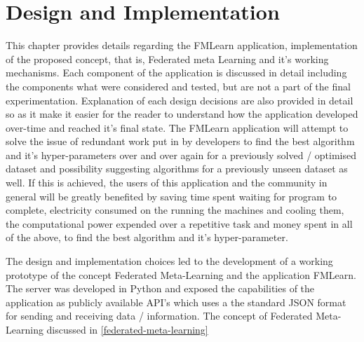 \chapter{Design and Implementation}

This chapter provides details regarding the FMLearn application, implementation of the proposed concept, that is, Federated meta Learning and it's working mechanisms. Each component of the application is discussed in detail including the components what were considered and tested, but are not a part of the final experimentation. Explanation of each design decisions are also provided in detail so as it make it easier for the reader to understand how the application developed over-time and reached it's final state. The FMLearn application will attempt to solve the issue of redundant work put in by developers to find the best algorithm and it's hyper-parameters over and over again for a previously solved / optimised dataset and possibility suggesting algorithms for a previously unseen dataset as well. If this is achieved, the users of this application and the community in general will be greatly benefited by saving time spent waiting for program to complete, electricity consumed on the running the machines and cooling them, the computational power expended over a repetitive task and money spent in all of the above, to find the best algorithm and it's hyper-parameter.

The design and implementation choices led to the development of a working prototype of the concept Federated Meta-Learning and the application FMLearn. The server was developed in Python and exposed the capabilities of the application as publicly available API's which uses a the standard JSON format for sending and receiving data / information. The concept of Federated Meta-Learning discussed in \ref{federated-meta-learning}

